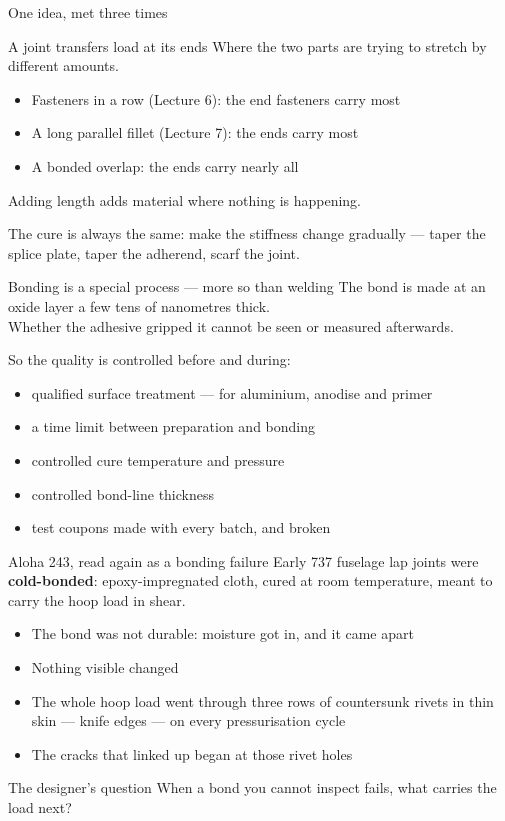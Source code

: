 \documentclass[aspectratio=169,10pt]{beamer}
\begin{document}
\begin{frame}{One idea, met three times}
\begin{block}{A joint transfers load at its ends}
Where the two parts are trying to stretch by different amounts.
\end{block}
\begin{itemize}
  \item Fasteners in a row (Lecture 6): the end fasteners carry most
  \item A long parallel fillet (Lecture 7): the ends carry most
  \item A bonded overlap: the ends carry nearly all
\end{itemize}
\vfill
Adding length adds material where nothing is happening.

\medskip
The cure is always the same: make the stiffness change \alert{gradually} --- taper the splice
plate, taper the adherend, scarf the joint.
\end{frame}

\begin{frame}{Bonding is a special process --- more so than welding}
The bond is made at an oxide layer a few tens of nanometres thick.\\
Whether the adhesive gripped it cannot be seen or measured afterwards.

\medskip
So the quality is controlled before and during:
\begin{itemize}
  \item qualified surface treatment --- for aluminium, anodise and primer
  \item a time limit between preparation and bonding
  \item controlled cure temperature and pressure
  \item controlled bond-line thickness
  \item test coupons made with every batch, and broken
\end{itemize}
\end{frame}

\begin{frame}{Aloha 243, read again as a bonding failure}
Early 737 fuselage lap joints were \textbf{cold-bonded}: epoxy-impregnated cloth, cured at room
temperature, meant to carry the hoop load in shear.

\medskip
\begin{itemize}
  \item The bond was not durable: moisture got in, and it came apart
  \item Nothing visible changed
  \item The whole hoop load went through three rows of countersunk rivets in thin skin --- knife
        edges --- on every pressurisation cycle
  \item The cracks that linked up began at those rivet holes
\end{itemize}
\vfill
\begin{alertblock}{The designer's question}
When a bond you cannot inspect fails, what carries the load next?
\end{alertblock}
\end{frame}
\end{document}
